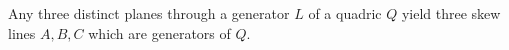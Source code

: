 Any three distinct planes through a generator $L$ of a quadric $Q$ yield three skew lines $A, B, C$ which are generators of $Q$.

